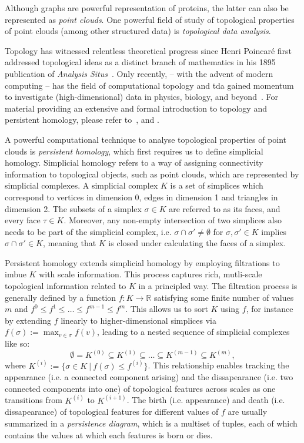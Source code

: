 Although graphs are powerful representation of proteins, the latter can also be
represented as \emph{point clouds}. One powerful field of study of topological
properties of point clouds (among other structured data) is \emph{topological
data analysis}.

Topology has witnessed relentless theoretical progress since Henri Poincar\'e
first addressed topological ideas as a distinct branch of mathematics in his
1895 publication of \textit{Analysis Situs}~\citep{poincare1895analysis}. Only
recently, -- with the advent of modern computing -- has the field of
computational topology and \acrfull{tda} gained momentum to
investigate (high-dimensional) data in physics, biology, and
beyond~\citep{dey1999computational, ghrist2008barcodes, amezquita2020shape}. For
material providing an extensive and formal introduction to topology and
persistent homology, please refer to~\citep{freedman2009algebraic,
edelsbrunner2010computational}, and \citep{ghrist2008barcodes}.

A powerful computational technique to analyse topological properties of point
clouds is \emph{persistent homology}, which first requires us to define
simplicial homology. Simplicial homology refers to a way of assigning
connectivity information to topological objects, such as point clouds, which are
represented by simplicial complexes. A simplicial complex $K$ is a set of
simplices which correspond to vertices in dimension 0, edges in dimension 1 and
triangles in dimension 2. The subsets of a simplex $\sigma\in K$ are referred to
as its faces, and every face $\tau\in K$. Moreover, any non-empty intersection
of two simplices also needs to be part of the simplicial complex, i.e.
$\sigma\cap\sigma '\neq\emptyset$ for $\sigma,\sigma '\in K$ implies
$\sigma\cap\sigma'\in K$, meaning that $K$ is closed under calculating the faces
of a simplex.

Persistent homology extends simplicial homology by employing filtrations to
imbue $K$ with scale information. This process captures rich, mutli-scale
topological information related to $K$ in a principled way. The filtration
process is generally defined by a function $f: K\to\mathbb{R}$ satisfying some
finite number of values $m$ and $f^{0}\leq f^{1}\leq\dots\leq f^{m-1}\leq
f^{m}$. This allows us to sort $K$ using $f$, for instance by extending $f$
linearly to higher-dimensional simplices via $f(\sigma):=\max_{v\in\sigma}f(v)$,
leading to a nested sequence of simplicial complexes like so:
\begin{equation}
  \label{eq:nested_simplicial_complexes}
  \emptyset=K^{(0)}\subseteq K^{(1)}\subseteq \dots\subseteq K^{(m-1)}\subseteq K^{(m)},
\end{equation}
where $K^{(i)}:=\{\sigma\in K\ |\ f(\sigma)\leq f^{(i)}\}$. This relationship
enables tracking the appearance (i.e. a connected component arising) and the
dissapearance (i.e. two connected components into one) of topological features
across scales as one transitions from $K^{(i)}$ to $K^{(i+1)}$. The birth (i.e.
appearance) and death (i.e. dissapearance) of topological features for different
values of $f$ are usually summarized in a \emph{persistence diagram}, which is a
multiset of tuples, each of which contains the values at which each features is
born or dies.

